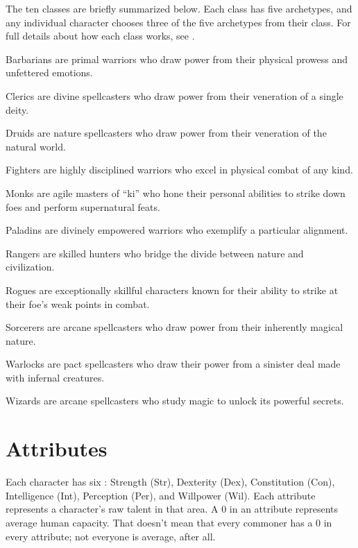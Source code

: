     The ten classes are briefly summarized below.
    Each class has five archetypes, and any individual character chooses three of the five archetypes from their class.
    For full details about how each class works, see .
    \begin{raggeditemize}
        \item Barbarians are primal warriors who draw power from their physical prowess and unfettered emotions.
        \item Clerics are divine spellcasters who draw power from their veneration of a single deity.
        \item Druids are nature spellcasters who draw power from their veneration of the natural world.
        \item Fighters are highly disciplined warriors who excel in physical combat of any kind.
        \item Monks are agile masters of ``ki'' who hone their personal abilities to strike down foes and perform supernatural feats.
        \item Paladins are divinely empowered warriors who exemplify a particular alignment.
        \item Rangers are skilled hunters who bridge the divide between nature and civilization.
        \item Rogues are exceptionally skillful characters known for their ability to strike at their foe's weak points in combat.
        \item Sorcerers are arcane spellcasters who draw power from their inherently magical nature.
        \item Warlocks are pact spellcasters who draw their power from a sinister deal made with infernal creatures.
        \item Wizards are arcane spellcasters who study magic to unlock its powerful secrets.
    \end{raggeditemize}

\section{Attributes}\label{Attributes}

    Each character has six : Strength (Str), Dexterity (Dex), Constitution (Con), Intelligence (Int), Perception (Per), and Willpower (Wil).
    Each attribute represents a character's raw talent in that area.
    A 0 in an attribute represents average human capacity.
    That doesn't mean that every commoner has a 0 in every attribute; not everyone is average, after all.

